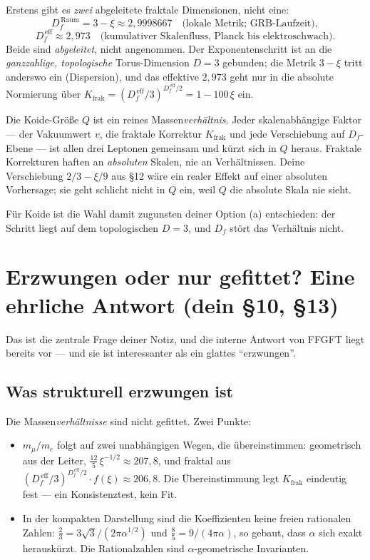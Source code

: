Erstens gibt es \emph{zwei} abgeleitete fraktale Dimensionen, nicht eine:
\[
  D_f^{\,\text{Raum}} = 3 - \xi \approx 2{,}9998667
  \quad\text{(lokale Metrik; GRB-Laufzeit)},
\]
\[
  D_f^{\,\text{eff}} \approx 2{,}973
  \quad\text{(kumulativer Skalenfluss, Planck bis elektroschwach)}.
\]
Beide sind \emph{abgeleitet}, nicht angenommen. Der Exponentenschritt ist an
die \emph{ganzzahlige, topologische} Torus-Dimension $D=3$ gebunden; die
Metrik $3-\xi$ tritt anderswo ein (Dispersion), und das effektive $2{,}973$
geht nur in die absolute Normierung über
$K_{\text{frak}} = (D_f^{\,\text{eff}}/3)^{D_f^{\,\text{eff}}/2} = 1 - 100\,\xi$
ein.

\begin{keyresult}
Die Koide-Größe $Q$ ist ein reines Massen\emph{verhältnis}. Jeder
skalenabhängige Faktor --- der Vakuumwert $v$, die fraktale Korrektur
$K_{\text{frak}}$ und jede Verschiebung auf $D_f$-Ebene --- ist allen drei
Leptonen gemeinsam und kürzt sich in $Q$ heraus. Fraktale Korrekturen haften
an \emph{absoluten} Skalen, nie an Verhältnissen. Deine Verschiebung
$2/3 - \xi/9$ aus \S12 wäre ein realer Effekt auf einer absoluten Vorhersage;
sie geht schlicht nicht in $Q$ ein, weil $Q$ die absolute Skala nie sieht.
\end{keyresult}

Für Koide ist die Wahl damit zugunsten deiner Option (a) entschieden: der
Schritt liegt auf dem topologischen $D=3$, und $D_f$ stört das Verhältnis
nicht.

\section{Erzwungen oder nur gefittet? Eine ehrliche Antwort (dein \S10, \S13)}

Das ist die zentrale Frage deiner Notiz, und die interne Antwort von FFGFT
liegt bereits vor --- und sie ist interessanter als ein glattes
``erzwungen''.

\subsection*{Was strukturell erzwungen ist}

Die Massen\emph{verhältnisse} sind nicht gefittet. Zwei Punkte:
\begin{itemize}
  \item $m_\mu/m_e$ folgt auf zwei unabhängigen Wegen, die übereinstimmen:
        geometrisch aus der Leiter, $\frac{12}{5}\,\xi^{-1/2} \approx 207{,}8$,
        und fraktal aus $(D_f^{\,\text{eff}}/3)^{D_f^{\,\text{eff}}/2}\!\cdot f(\xi)
        \approx 206{,}8$. Die Übereinstimmung legt $K_{\text{frak}}$ eindeutig
        fest --- ein Konsistenztest, kein Fit.
  \item In der kompakten Darstellung sind die Koeffizienten keine freien
        rationalen Zahlen: $\tfrac{2}{3} = 3\sqrt{3}/(2\pi\alpha^{1/2})$ und
        $\tfrac{8}{5} = 9/(4\pi\alpha)$, so gebaut, dass $\alpha$ sich exakt
        herauskürzt. Die Rationalzahlen sind $\alpha$-geometrische
        Invarianten.
\end{itemize}

